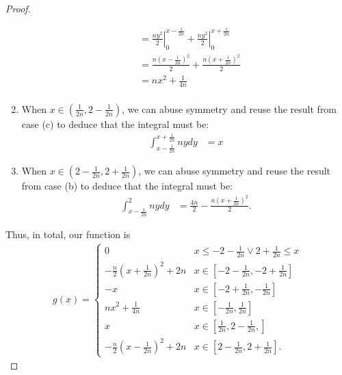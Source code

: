 \documentclass[12pt]{article}
\theoremstyle{remark}
\theoremstyle{named}
\begin{document}
\begin{proof}
\begin{enumerate}
\begin{align*}
            &= \left . \frac{ny^2}{2}\right |_{0}^{x-\frac{1}{2n}} + \left . \frac{ny^2}{2}\right |_{0}^{x+\frac{1}{2n}} \\
            &= \frac{n(x - \frac{1}{2n})^2}{2} + \frac{n(x + \frac{1}{2n})^2}{2} \\
            &= nx^2 + \frac{1}{4n} \\
        \end{align*}
        \item When \(x \in (\frac{1}{2n}, 2 - \frac{1}{2n})\), we can abuse symmetry and reuse the result from case (c) to deduce that the integral must be:
        \begin{align*}
            \int_{x-\frac{1}{2n}}^{x+\frac{1}{2n}} ny dy &= x
        \end{align*}
        \item When \(x \in (2 - \frac{1}{2n}, 2 + \frac{1}{2n})\), we can abuse symmetry and reuse the result from case (b) to deduce that the integral must be:
        \begin{align*}
            \int_{x-\frac{1}{2n}}^{2} ny dy &= \frac{4n}{2} - \frac{n(x + \frac{1}{2n})^2}{2}.
        \end{align*}
    \end{enumerate}
    Thus, in total, our function is 
    \begin{align*}
        g(x) = \begin{cases}
            0 & x \leq -2 - \frac{1}{2n} \lor 2 + \frac{1}{2n} \leq x \\
            -\frac{n}{2}\left(x + \frac{1}{2n}\right)^2 + 2n & x \in [-2 - \frac{1}{2n}, -2 + \frac{1}{2n}] \\
            -x & x \in [-2 + \frac{1}{2n}, -\frac{1}{2n}] \\
            nx^2 + \frac{1}{4n} & x \in [-\frac{1}{2n}, \frac{1}{2n}] \\
            x & x \in [\frac{1}{2n}, 2 - \frac{1}{2n}, ] \\
            -\frac{n}{2}\left(x - \frac{1}{2n}\right)^2 + 2n & x \in [2 - \frac{1}{2n}, 2 + \frac{1}{2n}].
        \end{cases}
    \end{align*}
\end{proof}
\end{document}
